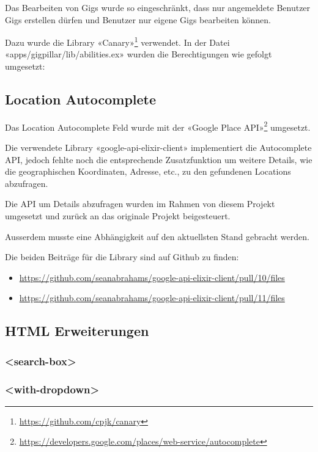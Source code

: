 Das Bearbeiten von Gigs wurde so eingeschränkt, dass nur angemeldete Benutzer Gigs erstellen dürfen und Benutzer nur eigene Gigs bearbeiten können.

Dazu wurde die Library «Canary»\footnote{\url{https://github.com/cpjk/canary}} verwendet. In der Datei «apps/gigpillar/lib/abilities.ex» wurden die Berechtigungen wie gefolgt umgesetzt:



\clearpage
\subsection{Location Autocomplete}

Das Location Autocomplete Feld wurde mit der «Google Place API»\footnote{\url{https://developers.google.com/places/web-service/autocomplete}} umgesetzt.

Die verwendete Library «google-api-elixir-client» implementiert die
Autocomplete API, jedoch fehlte noch die entsprechende Zusatzfunktion um
weitere Details, wie die geographischen Koordinaten, Adresse, etc., zu den gefundenen Locations abzufragen.

Die API um Details abzufragen wurden im Rahmen von diesem Projekt umgesetzt
und zurück an das originale Projekt beigesteuert.

Ausserdem musste eine Abhängigkeit auf den aktuellsten Stand gebracht werden.

Die beiden Beiträge für die Library sind auf Github zu finden:

\begin{itemize}
  \item{} \url{https://github.com/seanabrahams/google-api-elixir-client/pull/10/files}
  \item{} \url{https://github.com/seanabrahams/google-api-elixir-client/pull/11/files}
\end{itemize}

\clearpage
\subsection{HTML Erweiterungen}

\subsubsection{<search-box>}

\subsubsection{<with-dropdown>}

